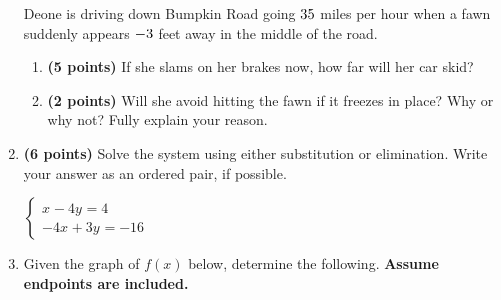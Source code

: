\documentclass[12pt]{amsart}
\begin{document}
\begin{enumerate}
\vspace{3mm}

Deone is driving down Bumpkin Road going $35$ miles per hour when a fawn suddenly appears $\d$ feet away in the middle of the road. \begin{enumerate}
\item {\bf (5 points)} If she slams on her brakes now, how far will her car skid? \vspace{4cm}
\item {\bf (2 points)} Will she avoid hitting the fawn if it freezes in place? Why or why not? Fully explain your reason. \vspace{3cm}
\end{enumerate}


\newpage\def \xis{4}\def \yis{0}\def \nomatcho{[3,5,2,3]}\def \a{3}\def \c{5}\def \b{-2}\def \d{-3}\def \polyonesol{12}\def \polytwosol{20}\def \xgoodone{3x^{}}\def \ygoodone{-2y^{}}\def \xgoodtwo{5x^{}}\def \ygoodtwo{-3y^{}}\def \unitize{[1,0,0,0,1,0]}\def \mtem{-2}\def \ntem{-4}\def \ptem{-4}\def \qtem{3}\def \m{1}\def \n{-4}\def \p{-4}\def \q{3}\def \polytonesol{4}\def \polyttwosol{-16}\def \xtgoodone{x^{}}\def \ytgoodone{-4y^{}}\def \xtgoodtwo{-4x^{}}\def \ytgoodtwo{+3y^{}}
\item {\bf (6 points)} 
 Solve the system using either substitution or elimination. Write your answer as an ordered pair, if possible. 

$ \begin{cases} \xtgoodone \ytgoodone = \polytonesol \\
\xtgoodtwo \ytgoodtwo = \polyttwosol
\end{cases}$

 \vfill \vfill
\newpage\def \vshift{5}\def \hshift{-4}\def \chang{-2}\def \findval{-6}\def \yval{9}

 
\item Given the graph of $f(x)$ below, determine the following. {\bf Assume endpoints are included.}
\vspace{2mm}

\end{enumerate}
\end{document}
